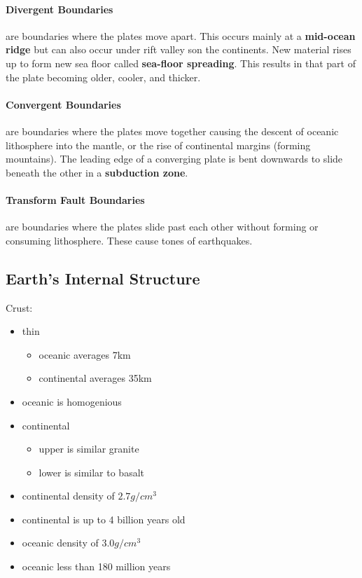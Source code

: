 \documentclass{article}
\begin{document}
\paragraph{Divergent Boundaries} are boundaries where the plates move apart. This occurs mainly at a \textbf{mid-ocean ridge} but can also occur under rift valley son the continents. New material rises up to form new sea floor called \textbf{sea-floor spreading}. This results in that part of the plate becoming older, cooler, and thicker.

\paragraph{Convergent Boundaries} are boundaries where the plates move together causing the descent of oceanic lithosphere into the mantle, or the rise of continental margins (forming mountains). The leading edge of a converging plate is bent downwards to slide beneath the other in a \textbf{subduction zone}.

\paragraph{Transform Fault Boundaries} are boundaries where the plates slide past each other without forming or consuming lithosphere. These cause tones of earthquakes.

\subsection{Earth's Internal Structure} %
\label{sub:earth_s_internal_structure}
Crust:
\begin{itemize}
    \item thin
    \begin{itemize}
         \item oceanic averages 7km
         \item continental averages 35km
     \end{itemize}
     \item oceanic is homogenious
     \item continental
     \begin{itemize}
         \item upper is similar granite
         \item lower is similar to basalt
     \end{itemize}
     \item continental density of $2.7 g/cm^3$
     \item continental is up to 4 billion years old
     \item oceanic density of $3.0 g/cm^3$
     \item oceanic less than 180 million years
\end{itemize}
\end{document}

